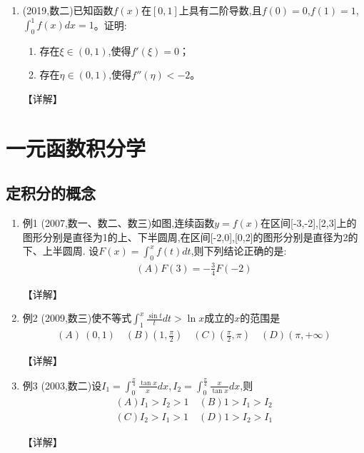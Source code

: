 \documentclass[12pt, a4paper, oneside, UTF8]{ctexbook}
\begin{document}
\begin{enumerate}[label=\arabic*.,start=28]
    \item  (2019,数二)已知函数$f(x)$在$[0,1]$上具有二阶导数,且$f(0)=0$,$f(1)=1$,$\int_0^1 f(x)dx=1$。证明:
    \begin{enumerate}[label=(\roman*)]
        \item 存在$\xi\in(0,1)$,使得$f'(\xi)=0$；
        \item 存在$\eta\in(0,1)$,使得$f''(\eta)<-2$。
    \end{enumerate}
    
    \begin{solution}
    【详解】
    \end{solution}
\end{enumerate}

\section{一元函数积分学}
\subsection{ 定积分的概念}

\begin{enumerate}[label=\arabic*.]
    \item 例1 (2007,数一、数二、数三)如图,连续函数$y=f(x)$在区间[-3,-2],[2,3]上的图形分别是直径为1的上、下半圆周,在区间[-2,0],[0,2]的图形分别是直径为2的下、上半圆周.
    设$F(x)=\int_0^x f(t) dt$,则下列结论正确的是:
    \begin{align*}
        (A) F(3)=-\frac{3}{4} F(-2)
    \end{align*}
    
    \begin{solution}
    【详解】
    \end{solution}
    
    \item 例2 (2009,数三)使不等式$\int_1^x\frac{\sin t}{t} dt>\ln x$成立的$x$的范围是
    \begin{align*}
        (A)\ (0,1)\quad(B)\left(1,\frac{\pi}{2}\right)\quad(C)\left(\frac{\pi}{2},\pi\right)\quad(D)(\pi,+\infty)
    \end{align*}
    
    \begin{solution}
    【详解】
    \end{solution}
    
    \item 例3 (2003,数二)设$I_1=\int_0^{\frac{\pi}{4}}\frac{\tan x}{x} dx, I_2=\int_0^{\frac{\pi}{4}}\frac{x}{\tan x} dx$,则
    \begin{align*}
        (A) I_1>I_2>1\quad(B) 1>I_1>I_2 \\
        (C) I_2>I_1>1\quad(D) 1>I_2>I_1
    \end{align*}
    
    \begin{solution}
    【详解】
    \end{solution}
\end{enumerate}
\end{document}
